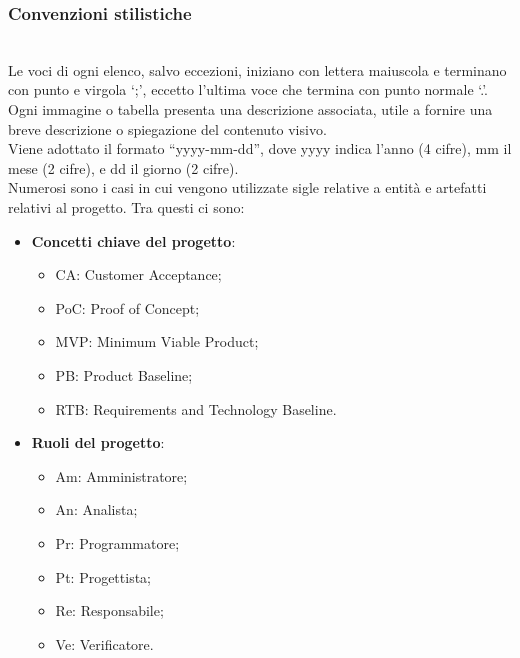 \begin{itemize}
\subsubsection{Convenzioni stilistiche}
\\
Le voci di ogni elenco, salvo eccezioni, iniziano con lettera maiuscola e terminano con punto e virgola `;', eccetto l'ultima voce che termina con punto normale `.'.
\\
Ogni immagine o tabella presenta una descrizione associata, utile a fornire una breve descrizione o spiegazione del contenuto visivo.
\\
Viene adottato il formato “yyyy-mm-dd”, dove yyyy indica l'anno (4 cifre), mm il mese (2 cifre), e dd il giorno (2 cifre).
\\
Numerosi sono i casi in cui vengono utilizzate sigle relative a entità e artefatti relativi al progetto. Tra questi ci sono:
\begin{itemize}
    \item \textbf{Concetti chiave del progetto}:
        \begin{itemize}
            \item CA: Customer Acceptance;
            \item PoC: Proof of Concept;
            \item MVP: Minimum Viable Product;
            \item PB: Product Baseline;
            \item RTB: Requirements and Technology Baseline.
        \end{itemize}
    \item \textbf{Ruoli del progetto}:
        \begin{itemize}
            \item Am: Amministratore;
            \item An: Analista;
            \item Pr: Programmatore;
            \item Pt: Progettista;
            \item Re: Responsabile;
            \item Ve: Verificatore.
        \end{itemize}
\end{itemize}


\end{itemize}
